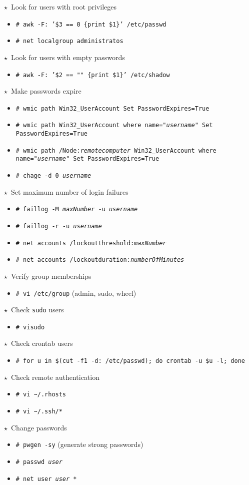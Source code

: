 \documentclass[10pt,landscape]{article}
\newcommand{\os}[1]{\texttt{\footnotesize{#1}}}
\newcommand{\unix}{\os{U}}
\newcommand{\linux}{\os{L}}
\newcommand{\windows}{\os{W}}
\newenvironment{action}[1]
  {\begin{minipage}[c]{\linewidth}$\star$~#1\begin{itemize}[leftmargin=1cm]}
  {\end{itemize}\end{minipage}\vspace*{3pt}}
\newcommand{\cmd}[2]{\item[#1] {\small\tt\# #2}}
\newcommand{\comment}[1]{\textrm{\small(#1)}}
\begin{document}
\begin{multicols*}{3}
\begin{action}{Look for users with root privileges}
\cmd{\unix}{awk -F: '\$3 == 0 \{print \$1\}' /etc/passwd}
\cmd{\windows}{net localgroup administratos}
\end{action}

\begin{action}{Look for users with empty passwords}
\cmd{\unix}{awk -F: '\$2 == "" \{print \$1\}' /etc/shadow}
\end{action}

\begin{action}{Make passwords expire}
\cmd{\windows}{wmic path Win32\_UserAccount Set PasswordExpires=True}
\cmd{\windows}{wmic path Win32\_UserAccount where name="\emph{username}" Set PasswordExpires=True}
\cmd{\windows}{wmic path /Node:\emph{remotecomputer} Win32\_UserAccount where name="\emph{username}" Set PasswordExpires=True}
\cmd{\linux}{chage -d 0 \emph{username}}
\end{action}

\begin{action}{Set maximum number of login failures}
\cmd{\linux}{faillog -M \emph{maxNumber} -u \emph{username}}
\cmd{\linux}{faillog -r -u \emph{username}}
\cmd{\windows}{net accounts /lockoutthreshold:\emph{maxNumber}}
\cmd{\windows}{net accounts /lockoutduration:\emph{numberOfMinutes}}
\end{action}

\begin{action}{Verify group memberships}
\cmd{\unix}{vi /etc/group} \comment{admin, sudo, wheel}
\end{action}

\begin{action}{Check \texttt{sudo} users}
\cmd{\unix}{visudo}
\end{action}

\begin{action}{Check crontab users}
\cmd{\unix}{for u in \$(cut -f1 -d: /etc/passwd); do crontab -u \$u -l; done}
\end{action}

\begin{action}{Check remote authentication}
\cmd{\unix}{vi \textasciitilde/.rhosts}
\cmd{\unix}{vi \textasciitilde/.ssh/*}
\end{action}

\begin{action}{Change passwords}
\cmd{\unix}{pwgen -sy} \comment{generate strong passwords}
\cmd{\unix}{passwd \emph{user}}
\cmd{\windows}{net user \emph{user} *}
\end{action}


\end{multicols*}
\end{document}
